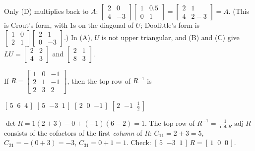 \begin{question}[id=gate-ee2011-1, source=GATE EE 2011, marks=2]
\begin{solution}
Only (D) multiplies back to $A$: $\begin{bmatrix} 2 & 0 \\ 4 & -3 \end{bmatrix}\begin{bmatrix} 1 & 0.5 \\ 0 & 1 \end{bmatrix} = \begin{bmatrix} 2 & 1 \\ 4 & 2 - 3 \end{bmatrix} = A$. (This is Crout's form, with 1s on the diagonal of $U$; Doolittle's form is $\begin{bmatrix} 1 & 0 \\ 2 & 1 \end{bmatrix}\begin{bmatrix} 2 & 1 \\ 0 & -3 \end{bmatrix}$.) In (A), $U$ is not upper triangular, and (B) and (C) give $LU = \begin{bmatrix} 2 & 2 \\ 4 & 3 \end{bmatrix}$ and $\begin{bmatrix} 2 & 1 \\ 8 & 3 \end{bmatrix}$.
\end{solution}
\end{question}

\begin{question}[id=gate-ee2005-2, source=GATE EE 2005, marks=2]
If $R = \begin{bmatrix} 1 & 0 & -1 \\ 2 & 1 & -1 \\ 2 & 3 & 2 \end{bmatrix}$, then the top row of $R^{-1}$ is
\begin{options}
  \option $[\,5 \;\; 6 \;\; 4\,]$
  \correct $[\,5 \;\; {-3} \;\; 1\,]$
  \option $[\,2 \;\; 0 \;\; {-1}\,]$
  \option $[\,2 \;\; {-1} \;\; \tfrac{1}{2}\,]$
\end{options}
\begin{solution}
$\det R = 1(2 + 3) - 0 + (-1)(6 - 2) = 1$. The top row of $R^{-1} = \frac{1}{\det R}\operatorname{adj} R$ consists of the cofactors of the first \emph{column} of $R$: $C_{11} = 2 + 3 = 5$, $C_{21} = -(0 + 3) = -3$, $C_{31} = 0 + 1 = 1$. Check: $[\,5 \;\; {-3} \;\; 1\,]\,R = [\,1 \;\; 0 \;\; 0\,]$.
\end{solution}
\end{question}

